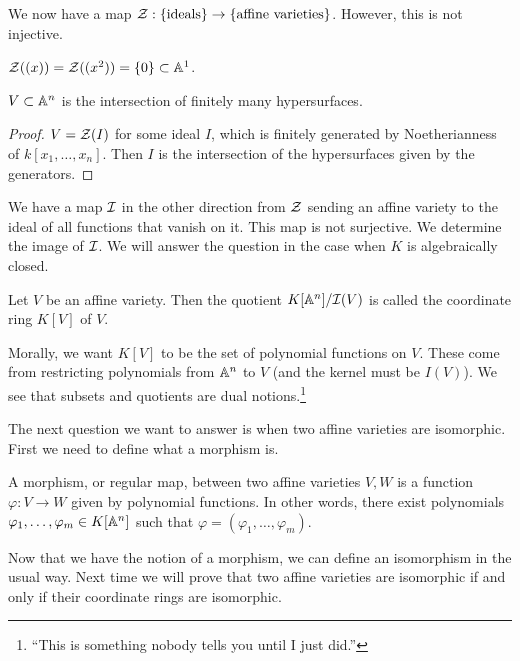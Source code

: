 \documentclass[10pt, twoside]{article}
\begin{document}
        We now have a map $\mathcal{Z}: \{\text{ideals}\} \to \{\text{affine varieties}\}$. However, this is not injective.

        \begin{exm}
            $\mathcal{Z}((x)) = \mathcal{Z}((x^2)) = \{0\} \subset \mathbb{A}^1$.
        \end{exm}

        \begin{prop}
            $V \subset \mathbb{A}^n$ is the intersection of finitely many hypersurfaces.
            \begin{proof}
                $V = \mathcal{Z}(I)$ for some ideal $I$, which is finitely generated by Noetherianness of $k[x_1, \ldots, x_n]$. Then $I$ is the intersection of the hypersurfaces given by the generators.
            \end{proof}
        \end{prop}

        We have a map $\mathcal{I}$ in the other direction from $\mathcal{Z}$ sending an affine variety to the ideal of all functions that vanish on it. This map is not surjective. We determine the image of $\mathcal{I}$. We will answer the question in the case when $K$ is algebraically closed.

        \begin{defn}
            Let $V$ be an affine variety. Then the quotient $K[\mathbb{A}^n]/\mathcal{I}(V)$ is called the coordinate ring $K[V]$ of $V$.
        \end{defn}

        Morally, we want $K[V]$ to be the set of polynomial functions on $V$. These come from restricting polynomials from $\mathbb{A}^n$ to $V$ (and the kernel must be $I(V)$). We see that subsets and quotients are dual notions.\footnote{``This is something nobody tells you until I just did.''}

        The next question we want to answer is when two affine varieties are isomorphic. First we need to define what a morphism is.

        \begin{defn}
            A morphism, or regular map, between two affine varieties $V,W$ is a function $\varphi:V \to W$ given by polynomial functions. In other words, there exist polynomials $\varphi_1, \ldots, \varphi_m \in K[\mathbb{A}^n]$ such that $\varphi = (\varphi_1, \ldots, \varphi_m)$.
        \end{defn}

        Now that we have the notion of a morphism, we can define an isomorphism in the usual way. Next time we will prove that two affine varieties are isomorphic if and only if their coordinate rings are isomorphic.
        
\end{document}
